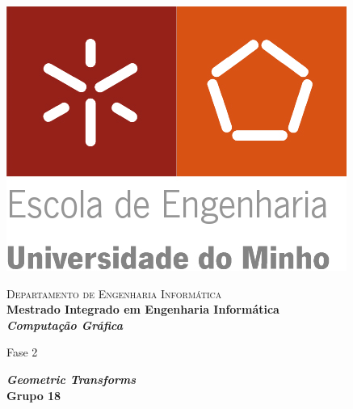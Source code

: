 \begin{titlepage}


\begin{minipage}{0.3\textwidth}
\begin{flushleft} 
\includegraphics[width=\textwidth]{logo.png}
\end{flushleft}
\end{minipage}
\begin{minipage}{0.6\textwidth}
\begin{flushright} 

\textsc{Departamento de Engenharia Informática}\\[0.1cm]
\bfseries Mestrado Integrado em Engenharia Informática \\ [0.1cm]
\bfseries \textit{Computação Gráfica}\\[8mm]

\end{flushright}
\end{minipage}


\vspace{3cm}


\begin{center}


\LARGE Fase 2

\Large \textbf{\textit{Geometric Transforms}}\\[1.5cm]


{\Large \bfseries Grupo 18\\[2cm] }



\end{center}
\end{titlepage}
